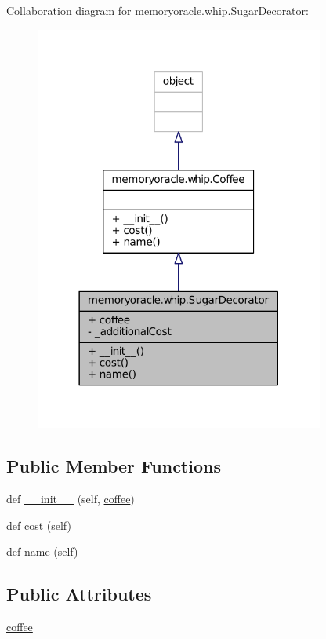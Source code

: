 Collaboration diagram for memoryoracle.\+whip.\+Sugar\+Decorator\+:\nopagebreak
\begin{figure}[H]
\begin{center}
\leavevmode
\includegraphics[width=270pt]{classmemoryoracle_1_1whip_1_1SugarDecorator__coll__graph}
\end{center}
\end{figure}
\subsection*{Public Member Functions}
\begin{DoxyCompactItemize}
\item 
def \hyperlink{classmemoryoracle_1_1whip_1_1SugarDecorator_aa8d023086425672d4d8836a92e3afbd2}{\+\_\+\+\_\+init\+\_\+\+\_\+} (self, \hyperlink{classmemoryoracle_1_1whip_1_1SugarDecorator_a01b5aa427d88f7520053a5ff67ef126d}{coffee})
\item 
def \hyperlink{classmemoryoracle_1_1whip_1_1SugarDecorator_ae9c4fce8244f6c28a1b95b04c1b22483}{cost} (self)
\item 
def \hyperlink{classmemoryoracle_1_1whip_1_1SugarDecorator_a03f5ae1d7fc30514bedc3997dbfb577c}{name} (self)
\end{DoxyCompactItemize}
\subsection*{Public Attributes}
\begin{DoxyCompactItemize}
\item 
\hyperlink{classmemoryoracle_1_1whip_1_1SugarDecorator_a01b5aa427d88f7520053a5ff67ef126d}{coffee}
\end{DoxyCompactItemize}
